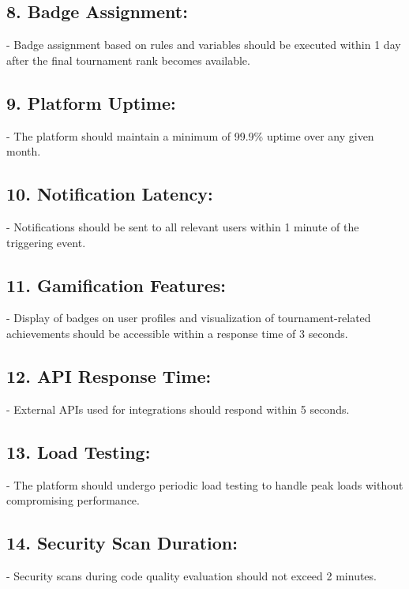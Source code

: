 \subsection*{8. Badge Assignment:}
   - Badge assignment based on rules and variables should be executed within 1 day after the final tournament rank becomes available.

\subsection*{9. Platform Uptime:}
   - The platform should maintain a minimum of 99.9\% uptime over any given month.

\subsection*{10. Notification Latency:}
    - Notifications should be sent to all relevant users within 1 minute of the triggering event.

\subsection*{11. Gamification Features:}
    - Display of badges on user profiles and visualization of tournament-related achievements should be accessible within a response time of 3 seconds.

\subsection*{12. API Response Time:}
    - External APIs used for integrations should respond within 5 seconds.

\subsection*{13. Load Testing:}
    - The platform should undergo periodic load testing to handle peak loads without compromising performance.

\subsection*{14. Security Scan Duration:}
    - Security scans during code quality evaluation should not exceed 2 minutes.







